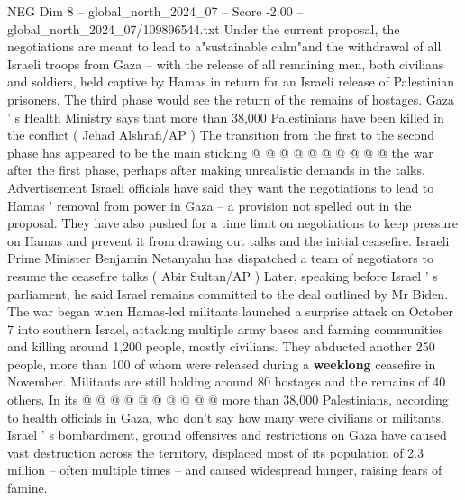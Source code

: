 \begin{textsample}{NEG Dim 8 – global\_north\_2024\_07 – Score -2.00 – global\_north\_2024\_07/109896544.txt}
Under the current proposal, the negotiations are meant to lead to a"sustainable calm"and the withdrawal of all Israeli troops from Gaza -- with the release of all remaining men, both civilians and soldiers, held captive by Hamas in return for an Israeli release of Palestinian prisoners.
The third phase would see the return of the remains of hostages.
Gaza ' s Health Ministry says that more than 38,000 Palestinians have been killed in the conflict ( Jehad Alshrafi/AP ) The transition from the first to the second phase has appeared to be the main sticking @ @ @ @ @ @ @ @ @ @ the war after the first phase, perhaps after making unrealistic demands in the talks.
Advertisement Israeli officials have said they want the negotiations to lead to Hamas ' removal from power in Gaza -- a provision not spelled out in the proposal.
They have also pushed for a time limit on negotiations to keep pressure on Hamas and prevent it from drawing out talks and the initial ceasefire.
Israeli Prime Minister Benjamin Netanyahu has dispatched a team of negotiators to resume the ceasefire talks ( Abir Sultan/AP ) Later, speaking before Israel ' s parliament, he said Israel remains committed to the deal outlined by Mr Biden.
The war began when Hamas-led militants launched a surprise attack on October 7 into southern Israel, attacking multiple army bases and farming communities and killing around 1,200 people, mostly civilians.
They abducted another 250 people, more than 100 of whom were released during a \textbf{weeklong} ceasefire in November.
Militants are still holding around 80 hostages and the remains of 40 others.
In its @ @ @ @ @ @ @ @ @ @ more than 38,000 Palestinians, according to health officials in Gaza, who don't say how many were civilians or militants.
Israel ' s bombardment, ground offensives and restrictions on Gaza have caused vast destruction across the territory, displaced most of its population of 2.3 million -- often multiple times -- and caused widespread hunger, raising fears of famine.

\end{textsample}
